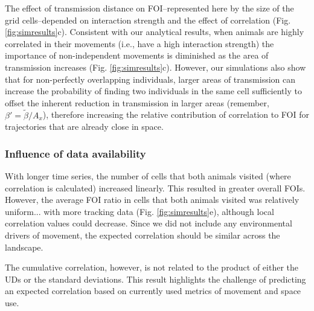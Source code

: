 \documentclass[letterpaper]{article}
\begin{document}
The effect of transmission distance on FOI--represented here by the size of the grid cells--depended on interaction strength and the effect of correlation (Fig. \ref{fig:simresults}c). Consistent with our analytical results, when animals are highly correlated in their movements (i.e., have a high interaction strength) the importance of non-independent movements is diminished as the area of transmission increases (Fig. \ref{fig:simresults}c).
However, our simulations also show that for non-perfectly overlapping individuals, larger areas of transmission can increase the probability of finding two individuals in the same cell sufficiently to offset the inherent reduction in transmission in larger areas (remember, $\beta' = \tilde{\beta} / A_x$), therefore increasing the relative contribution of correlation to FOI for trajectories that are already close in space.

\subsubsection*{Influence of data availability}

With longer time series, the number of cells that both animals visited (where correlation is calculated) increased linearly. This resulted in greater overall FOIs. However, the average FOI ratio in cells that both animals visited was relatively uniform...   %
with more tracking data (Fig. \ref{fig:simresults}e), although local correlation values could decrease. 
Since we did not include any environmental drivers of movement, the expected correlation should be similar across the landscape. 

The cumulative correlation, however, is not related to the product of either the UDs or the standard deviations. This result highlights the challenge of predicting an expected correlation based on currently used metrics of movement and space use.

\end{document}

